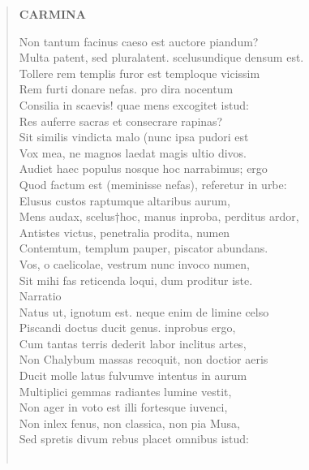 \documentclass[11pt, a4paper]{report}
\begin{document}
\begin{verse}
    \begin{center} \textbf{CARMINA} \end{center} \marginpar{[86]} Non  \lbrack tantum \rbrack  facinus caeso est auctore piandum? \\ Multa patent, sed pluralatent. scelusundique densum est. \\ Tollere rem templis furor est temploque vicissim \\ Rem furti donare nefas. pro dira nocentum \\ Consilia in scaevis! quae mens excogitet istud: \\ Res auferre sacras et consecrare rapinas? \\ Sit similis vindicta malo (nunc ipsa pudori est \\ Vox mea, ne magnos laedat magis ultio divos. \\ Audiet haec populus nosque hoc narrabimus; ergo \\ Quod factum est (meminisse nefas), referetur in urbe: \\ Elusus custos raptumque altaribus aurum, \\ Mens audax, scelus†hoc, manus inproba, perditus ardor, \\ Antistes victus, penetralia prodita, numen \\ Contemtum, templum pauper, piscator abundans. \\ Vos, o caelicolae, vestrum nunc invoco numen, \\ Sit mihi fas reticenda loqui, dum proditur iste. \\  \lbrack Narratio \rbrack  \\ Natus ut, ignotum est. neque enim de limine celso \\ Piscandi doctus ducit genus. inprobus ergo, \\ Cum tantas terris dederit labor inclitus artes, \\ Non Chalybum massas recoquit, non doctior aeris \\ Ducit molle latus fulvumve intentus in aurum \\ Multiplici gemmas radiantes lumine vestit, \\ Non ager in voto est illi fortesque iuvenci, \\ Non inlex fenus, non classica, non pia Musa, \\ Sed spretis divum rebus placet omnibus istud: \\ 
        ﻿\pagebreak 

\end{verse}
\end{document}
